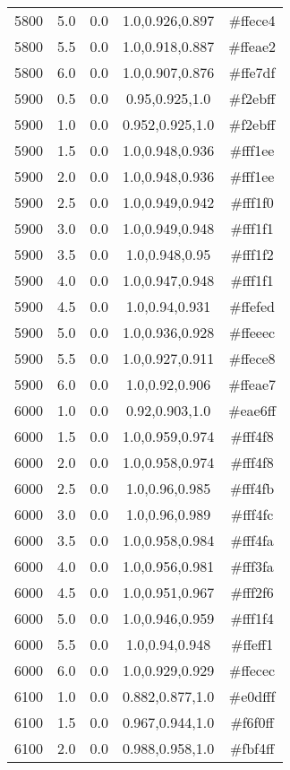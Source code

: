 \begin{tabular}{ccccc}
5800 & 5.0 & 0.0 & 1.0,0.926,0.897 & \#ffece4 \\ 
5800 & 5.5 & 0.0 & 1.0,0.918,0.887 & \#ffeae2 \\ 
5800 & 6.0 & 0.0 & 1.0,0.907,0.876 & \#ffe7df \\ 
5900 & 0.5 & 0.0 & 0.95,0.925,1.0 & \#f2ebff \\ 
5900 & 1.0 & 0.0 & 0.952,0.925,1.0 & \#f2ebff \\ 
5900 & 1.5 & 0.0 & 1.0,0.948,0.936 & \#fff1ee \\ 
5900 & 2.0 & 0.0 & 1.0,0.948,0.936 & \#fff1ee \\ 
5900 & 2.5 & 0.0 & 1.0,0.949,0.942 & \#fff1f0 \\ 
5900 & 3.0 & 0.0 & 1.0,0.949,0.948 & \#fff1f1 \\ 
5900 & 3.5 & 0.0 & 1.0,0.948,0.95 & \#fff1f2 \\ 
5900 & 4.0 & 0.0 & 1.0,0.947,0.948 & \#fff1f1 \\ 
5900 & 4.5 & 0.0 & 1.0,0.94,0.931 & \#ffefed \\ 
5900 & 5.0 & 0.0 & 1.0,0.936,0.928 & \#ffeeec \\ 
5900 & 5.5 & 0.0 & 1.0,0.927,0.911 & \#ffece8 \\ 
5900 & 6.0 & 0.0 & 1.0,0.92,0.906 & \#ffeae7 \\ 
6000 & 1.0 & 0.0 & 0.92,0.903,1.0 & \#eae6ff \\ 
6000 & 1.5 & 0.0 & 1.0,0.959,0.974 & \#fff4f8 \\ 
6000 & 2.0 & 0.0 & 1.0,0.958,0.974 & \#fff4f8 \\ 
6000 & 2.5 & 0.0 & 1.0,0.96,0.985 & \#fff4fb \\ 
6000 & 3.0 & 0.0 & 1.0,0.96,0.989 & \#fff4fc \\ 
6000 & 3.5 & 0.0 & 1.0,0.958,0.984 & \#fff4fa \\ 
6000 & 4.0 & 0.0 & 1.0,0.956,0.981 & \#fff3fa \\ 
6000 & 4.5 & 0.0 & 1.0,0.951,0.967 & \#fff2f6 \\ 
6000 & 5.0 & 0.0 & 1.0,0.946,0.959 & \#fff1f4 \\ 
6000 & 5.5 & 0.0 & 1.0,0.94,0.948 & \#ffeff1 \\ 
6000 & 6.0 & 0.0 & 1.0,0.929,0.929 & \#ffecec \\ 
6100 & 1.0 & 0.0 & 0.882,0.877,1.0 & \#e0dfff \\ 
6100 & 1.5 & 0.0 & 0.967,0.944,1.0 & \#f6f0ff \\ 
6100 & 2.0 & 0.0 & 0.988,0.958,1.0 & \#fbf4ff \\ 

\end{tabular}
